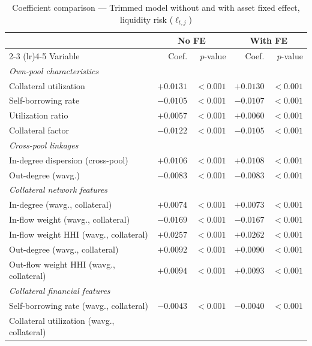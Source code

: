 \documentclass[a4paper,UKenglish,cleveref, autoref, thm-restate]{informs3}
\begin{document}
\FloatBarrier 
\begin{table}[ht]
\centering
\begin{threeparttable}
\caption{Coefficient comparison ---
         Trimmed model without and with asset fixed effect,
         liquidity risk ($\ell_{t,j}$)}
\label{tab:coefs_comparison}
\footnotesize
\begin{tabular}{lrrrr}
\toprule
& \multicolumn{2}{c}{No FE}
& \multicolumn{2}{c}{With FE} \\
\cmidrule(lr){2-3}
\cmidrule(lr){4-5}
Variable
    & Coef. & $p$-value
    & Coef. & $p$-value \\
\midrule
\multicolumn{5}{l}{\textit{Own-pool characteristics}} \\
Collateral utilization
    & $+0.0131$ & $<0.001$
    & $+0.0130$ & $<0.001$ \\
Self-borrowing rate
    & $-0.0105$ & $<0.001$
    & $-0.0107$ & $<0.001$ \\
Utilization ratio
    & $+0.0057$ & $<0.001$
    & $+0.0060$ & $<0.001$ \\
Collateral factor
    & $-0.0122$ & $<0.001$
    & $-0.0105$ & $<0.001$ \\
\midrule
\multicolumn{5}{l}{\textit{Cross-pool linkages}} \\
In-degree dispersion (cross-pool)
    & $+0.0106$ & $<0.001$
    & $+0.0108$ & $<0.001$ \\
Out-degree (wavg.)
    & $-0.0083$ & $<0.001$
    & $-0.0083$ & $<0.001$ \\
\midrule
\multicolumn{5}{l}{\textit{Collateral network features}} \\
In-degree (wavg., collateral)
    & $+0.0074$ & $<0.001$
    & $+0.0073$ & $<0.001$ \\
In-flow weight (wavg., collateral)
    & $-0.0169$ & $<0.001$
    & $-0.0167$ & $<0.001$ \\
In-flow weight HHI (wavg., collateral)
    & $+0.0257$ & $<0.001$
    & $+0.0262$ & $<0.001$ \\
Out-degree (wavg., collateral)
    & $+0.0092$ & $<0.001$
    & $+0.0090$ & $<0.001$ \\
Out-flow weight HHI (wavg., collateral)
    & $+0.0094$ & $<0.001$
    & $+0.0093$ & $<0.001$ \\
\midrule
\multicolumn{5}{l}{\textit{Collateral financial features}} \\
Self-borrowing rate (wavg., collateral)
    & $-0.0043$ & $<0.001$
    & $-0.0040$ & $<0.001$ \\
Collateral utilization (wavg., collateral)

\end{tabular}
\end{threeparttable}
\end{table}
\end{document}
